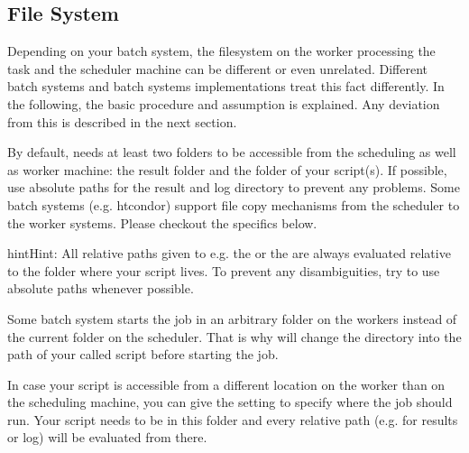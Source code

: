 \documentclass[letterpaper,10pt,english]{sphinxmanual}
\begin{document}
\subsection{File System}
\label{\detokenize{usage/batch:file-system}}
Depending on your batch system, the filesystem on the worker processing the task and the scheduler machine can be different or even unrelated.
Different batch systems and batch systems implementations treat this fact differently.
In the following, the basic procedure and assumption is explained.
Any deviation from this is described in the next section.

By default,  needs at least two folders to be accessible from the scheduling as well as worker machine:
the result folder and the folder of your script(s).
If possible, use absolute paths for the result and log directory to prevent any problems.
Some batch systems (e.g. htcondor) support file copy mechanisms from the scheduler to the worker systems.
Please checkout the specifics below.

\begin{sphinxadmonition}{hint}{Hint:}
All relative paths given to e.g. the  or the  are always evaluated
relative to the folder where your script lives.
To prevent any disambiguities, try to use absolute paths whenever possible.
\end{sphinxadmonition}

Some batch system starts the job in an arbitrary folder on the workers instead of the current folder on the scheduler.
That is why  will change the directory into the path of your called script before starting the job.

In case your script is accessible from a different location on the worker than on the scheduling machine, you can give the setting 
to specify where the job should run.
Your script needs to be in this folder and every relative path (e.g. for results or log) will be evaluated from there.
\end{document}
